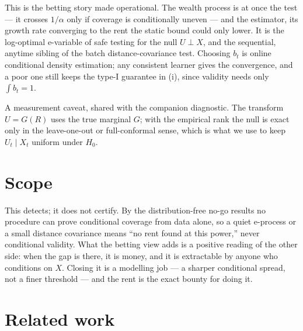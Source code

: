 \documentclass[11pt]{article}
\begin{document}
This is the betting story made operational. The wealth process is at once the test --- it crosses
$1/\alpha$ only if coverage is conditionally uneven --- and the estimator, its growth rate
converging to the rent the static bound could only lower. It is the log-optimal e-variable of safe
testing \citep{gruenwald2024,vovkwang2021} for the null $U\perp X$, and the sequential, anytime
sibling of the batch distance-covariance test. Choosing $b_t$ is online conditional density
estimation; any consistent learner gives the convergence, and a poor one still keeps the type-I
guarantee in (i), since validity needs only $\int b_t=1$.

A measurement caveat, shared with the companion diagnostic. The transform $U=G(R)$ uses the true
marginal $G$; with the empirical rank the null is exact only in the leave-one-out or full-conformal
sense, which is what we use to keep $U_t\mid X_t$ uniform under $H_0$.

\section{Scope}

This detects; it does not certify. By the distribution-free no-go results
\citep{leiwasserman2014,foygelbarber2021,vovk2012} no procedure can prove conditional coverage from
data alone, so a quiet e-process or a small distance covariance means ``no rent found at this
power,'' never conditional validity. What the betting view adds is a positive reading of the other
side: when the gap is there, it is money, and it is extractable by anyone who conditions on $X$.
Closing it is a modelling job --- a sharper conditional spread, not a finer threshold --- and the
rent is the exact bounty for doing it.

\section{Related work}
\end{document}
